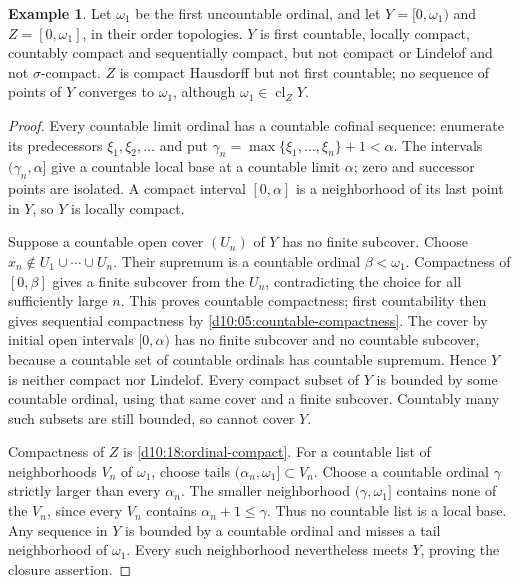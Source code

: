 \documentclass[11pt,oneside,openany]{book}
\theoremstyle{definition}
\newtheorem{example}[theorem]{Example}
\theoremstyle{remark}
\DeclareMathOperator{\cl}{cl}
\begin{document}
\begin{example}\label{d10:18:omega-one}
Let $\omega_1$ be the first uncountable ordinal, and let
$Y=[0,\omega_1)$ and $Z=[0,\omega_1]$, in their order topologies.
$Y$ is first countable, locally compact, countably compact and
sequentially compact, but not compact or Lindelof and not
$\sigma$-compact. $Z$ is compact Hausdorff but not first countable;
no sequence of points of $Y$ converges to $\omega_1$, although
$\omega_1\in\cl_Z Y$.
\end{example}
\begin{proof}
Every countable limit ordinal has a countable cofinal sequence:
enumerate its predecessors $\xi_1,\xi_2,\ldots$ and put
$\gamma_n=\max\{\xi_1,\ldots,\xi_n\}+1<\alpha$.
The intervals $(\gamma_n,\alpha]$ give a countable local
base at a countable limit $\alpha$; zero and successor points
are isolated. A compact interval $[0,\alpha]$ is a neighborhood
of its last point in $Y$, so $Y$ is locally compact.

Suppose a countable open cover $(U_n)$ of $Y$ has no finite
subcover. Choose $x_n\notin U_1\cup\cdots\cup U_n$.
Their supremum is a countable ordinal $\beta<\omega_1$.
Compactness of $[0,\beta]$ gives a finite subcover from the $U_n$,
contradicting the choice for all sufficiently large $n$.
This proves countable compactness; first countability then gives
sequential compactness by \cref{d10:05:countable-compactness}.
The cover by initial open intervals $[0,\alpha)$ has no finite
subcover and no countable subcover, because a countable set of
countable ordinals has countable supremum. Hence $Y$ is neither
compact nor Lindelof.
Every compact subset of $Y$ is bounded by some countable ordinal,
using that same cover and a finite subcover. Countably many such
subsets are still bounded, so cannot cover $Y$.

Compactness of $Z$ is \cref{d10:18:ordinal-compact}.
For a countable list of neighborhoods $V_n$ of $\omega_1$, choose
tails $(\alpha_n,\omega_1]\subset V_n$. Choose a countable ordinal
$\gamma$ strictly larger than every $\alpha_n$.
The smaller neighborhood $(\gamma,\omega_1]$ contains none of the
$V_n$, since every $V_n$ contains $\alpha_n+1\leq\gamma$.
Thus no countable list is a local base.
Any sequence in $Y$ is bounded by a countable ordinal and misses
a tail neighborhood of $\omega_1$. Every such neighborhood
nevertheless meets $Y$, proving the closure assertion.
\end{proof}
\end{document}
